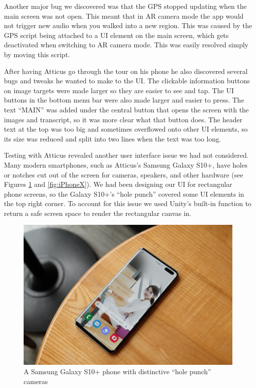 \documentclass[a4paper, 10pt, american, titlepage]{article}
\begin{document}
Another major bug we discovered was that the GPS stopped updating when the main
screen was not open. This meant that in AR camera mode the app would not trigger
new audio when you walked into a new region. This was caused by the GPS script
being attached to a UI element on the main screen, which gets deactivated when
switching to AR camera mode. This was easily resolved simply by moving this
script.

After having Atticus go through the tour on his phone he also discovered several
bugs and tweaks he wanted to make to the UI. The clickable information buttons
on image targets were made larger so they are easier to see and tap. The UI
buttons in the bottom menu bar were also made larger and easier to press. The
text ``MAIN'' was added under the central button that opens the screen with the
images and transcript, so it was more clear what that button does. The header
text at the top was too big and sometimes overflowed onto other UI elements, so
its size was reduced and split into two lines when the text was too long.

Testing with Atticus revealed another user interface issue we had not
considered.  Many modern smartphones, such as Atticus's Samsung Galaxy S10+,
have holes or notches cut out of the screen for cameras, speakers, and other
hardware (see Figures \ref{fig:galaxyS10Plus} and \ref{fig:iPhoneX}). We had
been designing our UI for rectangular phone screens, so the Galaxy S10+'s ``hole
punch'' covered some UI elements in the top right corner. To account for this
issue we used Unity's built-in function to return a safe screen space to render
the rectangular canvas in.

\begin{figure}[h]
	\centering
	\includegraphics[width=\textwidth]{galaxy-s10+.jpg}
	\caption[A Samsung Galaxy S10+ phone with distinctive ``hole punch''
	cameras]{A Samsung Galaxy S10+ phone with distinctive ``hole punch''
		cameras~\autocite{yoo2019}}
	\label{fig:galaxyS10Plus}
\end{figure}
\end{document}
